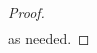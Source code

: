 \documentclass[12pt,reqno]{amsart}
\theoremstyle{plain}
\newtheorem{lemma}{Lemma}
\numberwithin{equation}{section}
\numberwithin{figure}{section}
\theoremstyle{plain}
\theoremstyle{definition}
\theoremstyle{remark}
\newcommand{\mmod}{\,\mathrm{mod}\,}
\begin{document}
\begin{proof}
\begin{align*}
  \end{align*}
  as needed. 
  
\end{proof}

\end{document}
